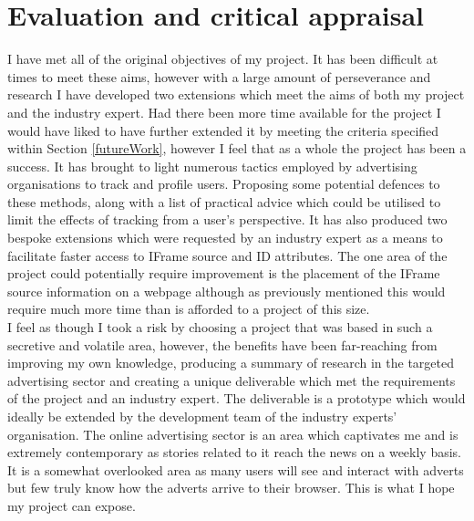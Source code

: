 \documentclass[12pt]{article}
\begin{document}
\section{Evaluation and critical appraisal} \label{eval}
I have met all of the original objectives of my project. It has been difficult at times to meet these aims, however with a large amount of perseverance and research I have developed two extensions which meet the aims of both my project and the industry expert. Had there been more time available for the project I would have liked to have further extended it by meeting the criteria specified within Section \ref{futureWork}, however I feel that as a whole the project has been a success. It has brought to light numerous tactics employed by advertising organisations to track and profile users. Proposing some potential defences to these methods, along with a list of practical advice which could be utilised to limit the effects of tracking from a user's perspective. It has also produced two bespoke extensions which were requested by an industry expert as a means to facilitate faster access to IFrame source and ID attributes. The one area of the project could potentially require improvement is the placement of the IFrame source information on a webpage although as previously mentioned this would require much more time than is afforded to a project of this size. \\

I feel as though I took a risk by choosing a project that was based in such a secretive and volatile area, however, the benefits have been far-reaching from improving my own knowledge, producing a summary of research in the targeted advertising sector and creating a unique deliverable which met the requirements of the project and an industry expert. The deliverable is a prototype which would ideally be extended by the development team of the industry experts' organisation. The online advertising sector is an area which captivates me and is extremely contemporary as stories related to it reach the news on a weekly basis. It is a somewhat overlooked area as many users will see and interact with adverts but few truly know how the adverts arrive to their browser. This is what I hope my project can expose. \\
\end{document}
